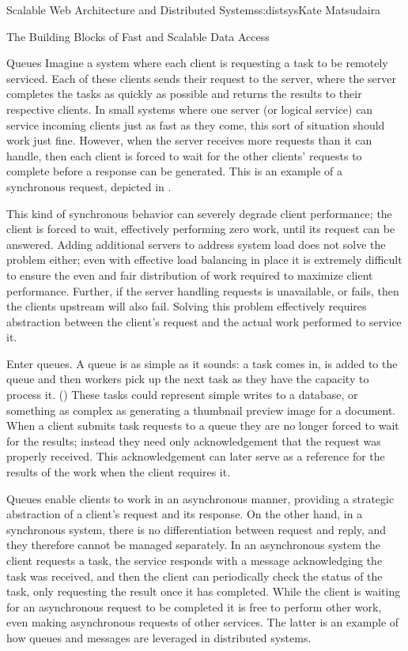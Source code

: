 \begin{aosachapter}{Scalable Web Architecture and Distributed Systems}{s:distsys}{Kate Matsudaira}
\begin{aosasect1}{The Building Blocks of Fast and Scalable Data Access}
\begin{aosasect2}{Queues}
Imagine a system where each client is requesting a task to be remotely
serviced. Each of these clients sends their request to the server,
where the server completes the tasks as quickly as possible and
returns the results to their respective clients. In small systems
where one server (or logical service) can service incoming clients
just as fast as they come, this sort of situation should work just
fine. However, when the server receives more requests than it can
handle, then each client is forced to wait for the other clients'
requests to complete before a response can be generated. This is an
example of a synchronous request, depicted in .


This kind of synchronous behavior can severely degrade client
performance; the client is forced to wait, effectively performing zero
work, until its request can be answered. Adding additional servers to
address system load does not solve the problem either; even with
effective load balancing in place it is extremely difficult to ensure
the even and fair distribution of work required to maximize client
performance. Further, if the server handling requests is unavailable,
or fails, then the clients upstream will also fail. Solving this
problem effectively requires abstraction between the client's request
and the actual work performed to service it.

Enter queues. A queue is as simple as it sounds: a task comes in, is
added to the queue and then workers pick up the next task as they have
the capacity to process it. () These tasks 
could represent simple writes to a
database, or something as complex as generating a thumbnail preview
image for a document. When a client submits task requests to a queue
they are no longer forced to wait for the results; instead they need
only acknowledgement that the request was properly received. This
acknowledgement can later serve as a reference for the results of the
work when the client requires it.

Queues enable clients to work in an asynchronous manner, providing a
strategic abstraction of a client's request and its response. On the
other hand, in a synchronous system, there is no differentiation
between request and reply, and they therefore cannot be managed
separately. In an asynchronous system the client requests a task, the
service responds with a message acknowledging the task was received,
and then the client can periodically check the status of the task,
only requesting the result once it has completed. While the client is
waiting for an asynchronous request to be completed it is free to
perform other work, even making asynchronous requests of other
services. The latter is an example of how queues and messages are
leveraged in distributed systems.


\end{aosasect2}
\end{aosasect1}
\end{aosachapter}

